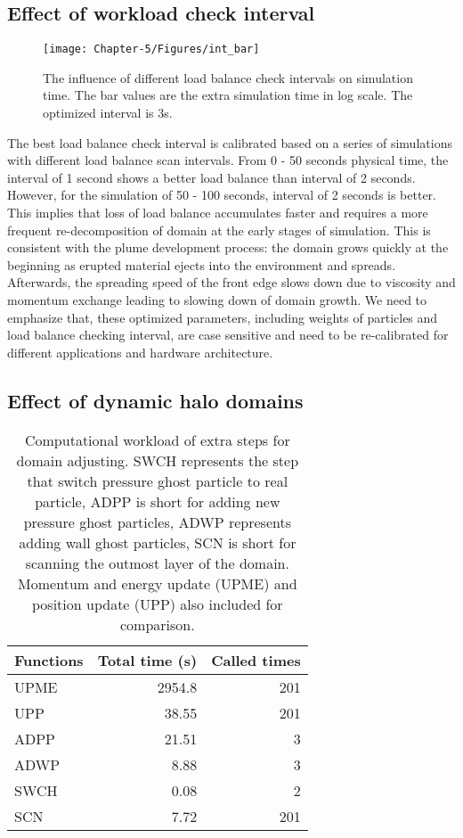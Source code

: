\subsection{Effect of workload check interval} \label{sec:effect-of-workload-check-interval}
\begin{figure}
\centering
{\texttt{[image: Chapter-5/Figures/int\_bar]}}
{\caption{The influence of different load balance check intervals on simulation time. The bar values are the extra simulation time in log scale. The optimized interval is 3s.}
\label{fig:check_int}}
\end{figure}
The best load balance check interval is calibrated based on a series of simulations with different load balance scan intervals. From 0 - 50 seconds physical time, the interval of 1 second shows a better load balance than interval of 2 seconds. However, for the simulation of 50 - 100 seconds, interval of 2 seconds is better. This implies that loss of load balance accumulates faster and requires a more frequent re-decomposition of domain at the early stages of simulation. This is consistent with the plume development process: the domain grows quickly at the beginning as erupted material ejects into the environment and spreads. Afterwards, the spreading speed of the front edge slows down due to viscosity and momentum exchange leading to slowing down of domain growth. We need to emphasize that, these optimized parameters, including weights of particles and load balance checking interval, are case sensitive and need to be re-calibrated for different applications and hardware architecture.

\subsection{Effect of dynamic halo domains} \label{sec:effect-of-halo-domain}

\begin{table}
\centering
{\caption{Computational workload of extra steps for domain adjusting. SWCH represents the step that switch pressure ghost particle to real particle, ADPP is short for adding new pressure ghost particles, ADWP represents adding wall ghost particles, SCN is short for scanning the outmost layer of the domain.  Momentum and energy update (UPME) and position update (UPP) also included for comparison.}  
    \begin{tabular}{lrr}
    \hline
    Functions & Total time (s) & Called times\\
    	\hline
    UPME & 2954.8 & 201 \\
    UPP & 38.55 &  201 \\
    ADPP & 21.51 & 3 \\
    ADWP  & 8.88 & 3 \\
    SWCH & 0.08 &  2 \\
    SCN  & 7.72 & 201 \\
    \hline
   \end{tabular}
\label{tab:Computational_cost_doamin_adj}}
\end{table}

